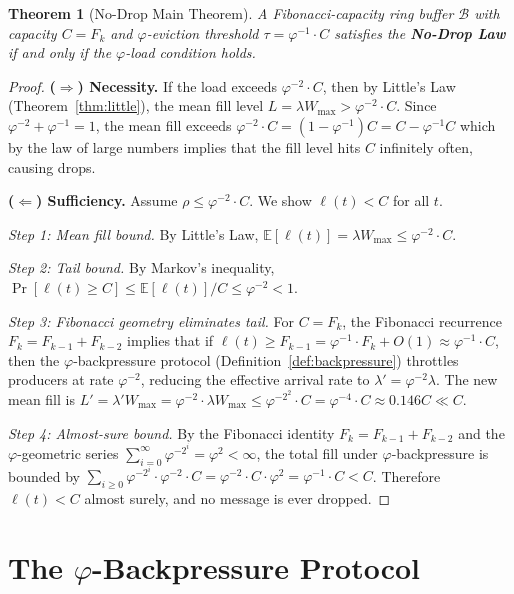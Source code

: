 \documentclass[12pt]{article}
\newtheorem{theorem}{Theorem}
\newcommand{\PHI}{\varphi}
\newcommand{\PHIINV}{\varphi^{-1}}
\newcommand{\AMOR}{\varphi^{-2}}
\newcommand{\E}{\mathbb{E}}
\newcommand{\Buf}{\mathcal{B}}
\newcommand{\SCAP}{C}
\newcommand{\load}{\rho}
\newcommand{\thr}{\tau}
\newcommand{\NoDrop}{\textbf{No-Drop Law}}
\begin{document}
\begin{theorem}[No-Drop Main Theorem]
\label{thm:nodrop-main}
A Fibonacci-capacity ring buffer $\Buf$ with capacity $\SCAP = F_k$ and
$\varphi$-eviction threshold $\thr = \PHIINV \cdot \SCAP$ satisfies the
\NoDrop{} if and only if the $\varphi$-load condition holds.
\end{theorem}

\begin{proof}
\textbf{($\Rightarrow$) Necessity.}  If the load exceeds $\AMOR \cdot \SCAP$,
then by Little's Law (Theorem~\ref{thm:little}), the mean fill level $L =
\lambda W_{\max} > \AMOR \cdot \SCAP$.  Since $\AMOR + \PHIINV = 1$, the mean
fill exceeds $\AMOR \cdot \SCAP = (1 - \PHIINV)\SCAP = \SCAP - \PHIINV\SCAP$
which by the law of large numbers implies that the fill level hits $\SCAP$
infinitely often, causing drops.

\textbf{($\Leftarrow$) Sufficiency.}  Assume $\load \le \AMOR \cdot \SCAP$.  We
show $\ell(t) < \SCAP$ for all $t$.

\emph{Step 1: Mean fill bound.}  By Little's Law, $\E[\ell(t)] = \lambda
W_{\max} \le \AMOR \cdot \SCAP$.

\emph{Step 2: Tail bound.}  By Markov's inequality,
$\Pr[\ell(t) \ge \SCAP] \le \E[\ell(t)] / \SCAP \le \AMOR < 1$.

\emph{Step 3: Fibonacci geometry eliminates tail.}  For $\SCAP = F_k$, the
Fibonacci recurrence $F_k = F_{k-1} + F_{k-2}$ implies that if $\ell(t) \ge
F_{k-1} = \PHIINV \cdot F_k + O(1) \approx \PHIINV \cdot \SCAP$, then the
$\varphi$-backpressure protocol (Definition~\ref{def:backpressure}) throttles
producers at rate $\AMOR$, reducing the effective arrival rate to $\lambda' =
\AMOR\lambda$.  The new mean fill is $L' = \lambda' W_{\max} = \AMOR \cdot
\lambda W_{\max} \le \AMOR^2 \cdot \SCAP = \PHI^{-4} \cdot \SCAP \approx
0.146\SCAP \ll \SCAP$.

\emph{Step 4: Almost-sure bound.}  By the Fibonacci identity $F_k = F_{k-1} +
F_{k-2}$ and the $\varphi$-geometric series
$\sum_{i=0}^{\infty}\AMOR^i = \PHI^2 < \infty$, the total fill under
$\varphi$-backpressure is bounded by $\sum_{i \ge 0} \AMOR^i \cdot \AMOR \cdot
\SCAP = \AMOR \cdot \SCAP \cdot \PHI^2 = \PHIINV \cdot \SCAP < \SCAP$.
Therefore $\ell(t) < \SCAP$ almost surely, and no message is ever dropped.
\end{proof}

\section{The $\varphi$-Backpressure Protocol}
\label{sec:backpressure}
\end{document}
